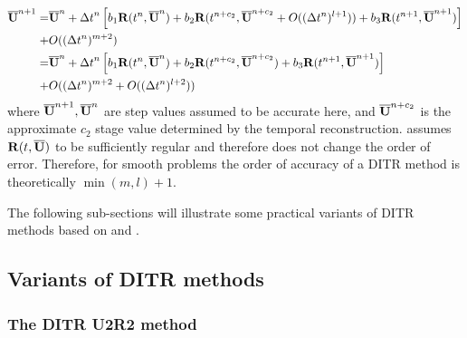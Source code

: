 \begin{equation}
    \begin{aligned}
        \overline{\mathbf{U}}^{n+1} = & \overline{\mathbf{U}}^{n} + {{\Delta} t}^{n}
        \left[
            b_1\mathbf{R}(t^n, \overline{\mathbf{U}}^n)
            +
            b_2\mathbf{R}(t^{n+c_2}, \overline{\mathbf{U}}^{n+c_2} + O(({\Delta} t^{n})^{l+1} ))
            +
            b_3\mathbf{R}(t^{n+1}, \overline{\mathbf{U}}^{n+1})
            \right]
        \\ + &
        O(({\Delta} t^{n})^{m+2} )               \\
        =           &
        \overline{\mathbf{U}}^{n} + {{\Delta} t}^{n}
        \left[
            b_1\mathbf{R}(t^n, \overline{\mathbf{U}}^n)
            +
            b_2\mathbf{R}(t^{n+c_2}, \overline{\mathbf{U}}^{n+c_2})
            +
            b_3\mathbf{R}(t^{n+1}, \overline{\mathbf{U}}^{n+1})
            \right]
        \\ + &
        O(({\Delta} t^{n})^{m+2}  + O(({\Delta} t^{n})^{l+2} ))
    \end{aligned}
    \label{eq:fullLTE}
\end{equation}
where $\overline{\mathbf{U}}^{n+1}, \overline{\mathbf{U}}^{n}$ are step values assumed to be accurate here, and
$\overline{\mathbf{U}}^{n+c_2}$ is the approximate
$c_2$ stage value determined by the temporal reconstruction.
 assumes
$\mathbf{R}(t, \overline{\mathbf{U}})$ to be sufficiently regular and therefore does not
change the order of error.
Therefore, for smooth problems the
order of accuracy of a DITR
method is theoretically $\min(m,l) + 1$.

The following sub-sections will illustrate some
practical variants of DITR methods based on  and .


\subsection{Variants of DITR methods}

\subsubsection{The DITR U2R2 method}

